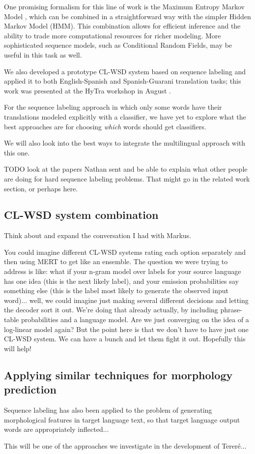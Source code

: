 One promising formalism for this line of work is the Maximum Entropy Markov
Model \cite{icml00/mccallum}, which can be combined in a straightforward way
with the simpler Hidden Markov Model (HMM).
This combination allows for efficient inference and the ability to trade more
computational resources for richer modeling. More sophisticated sequence
models, such as Conditional Random Fields, may be useful in this task as well.

We also developed a prototype CL-WSD system based on sequence labeling and
applied it to both English-Spanish and Spanish-Guarani translation tasks; this
work was presented at the HyTra workshop in August
\cite{rudnick-gasser:2013:HyTra-2013}.

For the sequence labeling approach in which only some words have their
translations modeled explicitly with a classifier, we have yet to explore what
the best approaches are for choosing \emph{which} words should get classifiers.

We will also look into the best ways to integrate the multilingual approach
with this one.

TODO look at the papers Nathan sent and be able to explain what other people
are doing for hard sequence labeling problems. That might go in the related
work section, or perhaps here.

\subsection{CL-WSD system combination}

Think about and expand the conversation I had with Markus.

You could imagine different CL-WSD systems rating each option separately and
then using MERT to get like an ensemble.
The question we were trying to address is like:
what if your n-gram model over labels for your source language has one idea
(this is the next likely label), and your emission probabilities say something
else (this is the label most likely to generate the observed input word)...
well, we could imagine just making several different decisions and letting the
decoder sort it out. We're doing that already actually, by including
phrase-table probabilities and a language model.
Are we just converging on the idea of a log-linear model again?
But the point here is that we don't have to have just one CL-WSD system. We can
have a bunch and let them fight it out. Hopefully this will help!

\subsection{Applying similar techniques for morphology prediction}

Sequence labeling has also been applied to the problem of generating
morphological features in target language text, so that target language output
words are appropriately inflected...
\cite{toutanova-suzuki-ruopp:2008:ACLMain}

This will be one of the approaches we investigate in the development of
Tereré...

